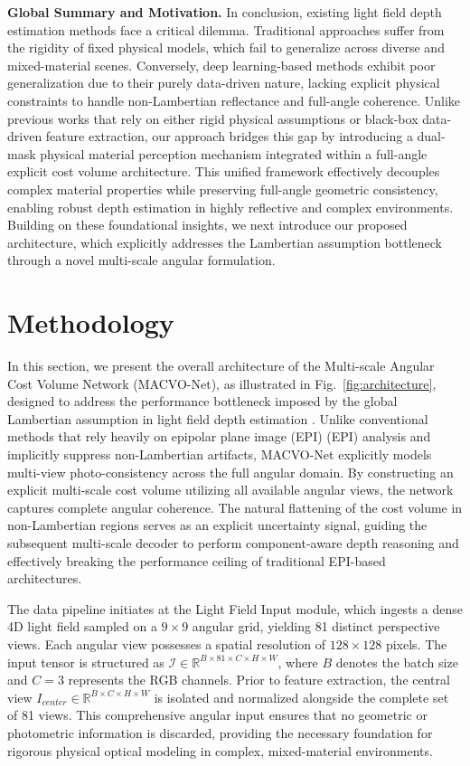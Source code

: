 \documentclass[lettersize,journal]{IEEEtran}
\begin{document}
\textbf{Global Summary and Motivation.}
In conclusion, existing light field depth estimation methods face a critical dilemma. Traditional approaches suffer from the rigidity of fixed physical models, which fail to generalize across diverse and mixed-material scenes. Conversely, deep learning-based methods exhibit poor generalization due to their purely data-driven nature, lacking explicit physical constraints to handle non-Lambertian reflectance and full-angle coherence. Unlike previous works that rely on either rigid physical assumptions or black-box data-driven feature extraction, our approach bridges this gap by introducing a dual-mask physical material perception mechanism integrated within a full-angle explicit cost volume architecture. This unified framework effectively decouples complex material properties while preserving full-angle geometric consistency, enabling robust depth estimation in highly reflective and complex environments. Building on these foundational insights, we next introduce our proposed architecture, which explicitly addresses the Lambertian assumption bottleneck through a novel multi-scale angular formulation.

\section{Methodology}

In this section, we present the overall architecture of the Multi-scale Angular Cost Volume Network (MACVO-Net), as illustrated in Fig.~\ref{fig:architecture}, designed to address the performance bottleneck imposed by the global Lambertian assumption in light field depth estimation \cite{li2021}. Unlike conventional methods that rely heavily on epipolar plane image (EPI) (EPI) analysis \cite{wanner2014, heber2018} and implicitly suppress non-Lambertian artifacts, MACVO-Net explicitly models multi-view photo-consistency across the full angular domain. By constructing an explicit multi-scale cost volume utilizing all available angular views, the network captures complete angular coherence. The natural flattening of the cost volume in non-Lambertian regions serves as an explicit uncertainty signal, guiding the subsequent multi-scale decoder to perform component-aware depth reasoning and effectively breaking the performance ceiling of traditional EPI-based architectures.

The data pipeline initiates at the Light Field Input module, which ingests a dense 4D light field sampled on a $9 \times 9$ angular grid, yielding 81 distinct perspective views. Each angular view possesses a spatial resolution of $128 \times 128$ pixels. The input tensor is structured as $\mathcal{I} \in \mathbb{R}^{B \times 81 \times C \times H \times W}$, where $B$ denotes the batch size and $C=3$ represents the RGB channels. Prior to feature extraction, the central view $I_{center} \in \mathbb{R}^{B \times C \times H \times W}$ is isolated and normalized alongside the complete set of 81 views. This comprehensive angular input ensures that no geometric or photometric information is discarded, providing the necessary foundation for rigorous physical optical modeling in complex, mixed-material environments.
\end{document}
